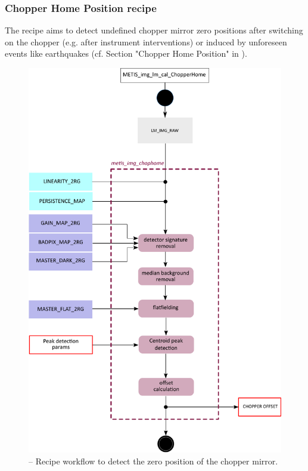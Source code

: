 \clearpage
\subsubsection{Chopper Home Position recipe }\label{ssec:metisimgchophome}
The recipe \hyperref[rec:metis_img_chophome]{} aims to detect undefined chopper mirror zero positions after switching on the chopper (e.g. after instrument interventions) or induced by unforeseen events like earthquakes (cf. Section "Chopper Home Position" in  \cite{METIS-calibration_plan}).
\begin{figure}[ht]
  \centering
  \includegraphics[width=0.5\textheight]{figures/metis_img_chophome_v0.83.pdf}
  \caption[Recipe: ]{ --
    Recipe workflow to detect the zero position of the chopper mirror.}
  \label{Fig:rec_chop_home}
\end{figure}

